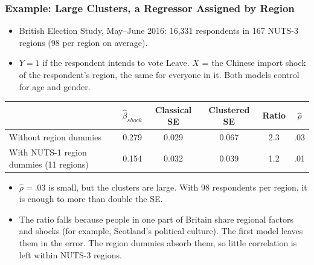 \documentclass[xcolor=svgnames,9pt,english,aspectratio=169,t]{beamer}
\begin{document}
\begin{frame}
\frametitle{Example: Large Clusters, a Regressor Assigned by Region}
\small
\begin{itemize}
\item British Election Study, May--June 2016: 16,331 respondents in 167 NUTS-3 regions (98 per region on average).
\item $Y = 1$ if the respondent intends to vote Leave. $X$ = the Chinese import shock of the respondent's region, the same for everyone in it. Both models control for age and gender.
\end{itemize}
\medskip
\begin{center}
\begin{tabular}{lccccc}
\hline
 & $\hat\beta_{shock}$ & Classical SE & Clustered SE & Ratio & $\hat\rho$ \\
\hline
Without region dummies & 0.279 & 0.029 & 0.067 & 2.3 & .03 \\
With NUTS-1 region dummies (11 regions) & 0.154 & 0.032 & 0.039 & 1.2 & .01 \\
\hline
\end{tabular}
\end{center}
\medskip
\pause
\begin{itemize}
\item $\hat\rho = .03$ is small, but the clusters are large. With 98 respondents per region, it is enough to more than double the SE.
\item The ratio falls because people in one part of Britain share regional factors and shocks (for example, Scotland's political culture). The first model leaves them in the error. The region dummies absorb them, so little correlation is left within NUTS-3 regions.
\end{itemize}
\end{frame}
\end{document}
